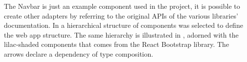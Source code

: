 
The Navbar is just an example component used in the project, it is possible to create other adapters by referring to the original APIs of the various libraries' documentation. In  a hierarchical structure of components was selected to define the web app structure. The same hierarchy is illustrated in , adorned with the lilac-shaded components that comes from the React Bootstrap library. The arrows declare a dependency of type composition.
